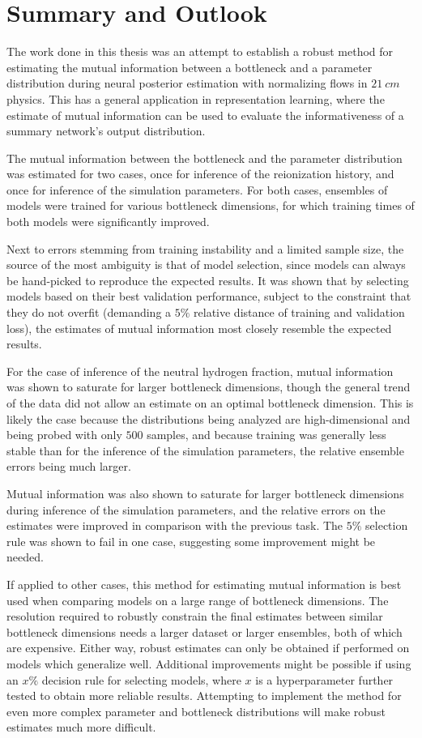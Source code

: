 \section{Summary and Outlook}
The work done in this thesis was an attempt to establish a robust method for estimating the mutual information between a bottleneck and a parameter distribution during neural posterior estimation with normalizing flows in $21~\si{cm}$ physics. This has a general application in representation learning, where the estimate of mutual information can be used to evaluate the informativeness of a summary network's output distribution. 

The mutual information between the bottleneck and the parameter distribution was estimated for two cases, once for inference of the reionization history, and once for inference of the simulation parameters. For both cases, ensembles of models were trained for various bottleneck dimensions, for which training times of both models were significantly improved.

Next to errors stemming from training instability and a limited sample size, the source of the most ambiguity is that of model selection, since models can always be hand-picked to reproduce the expected results. It was shown that by selecting models based on their best validation performance, subject to the constraint that they do not overfit (demanding a $5\%$ relative distance of training and validation loss), the estimates of mutual information most closely resemble the expected results.

For the case of inference of the neutral hydrogen fraction, mutual information was shown to saturate for larger bottleneck dimensions, though the general trend of the data did not allow an estimate on an optimal bottleneck dimension. This is likely the case because the distributions being analyzed are high-dimensional and being probed with only $500$ samples, and because training was generally less stable than for the inference of the simulation parameters, the relative ensemble errors being much larger.

Mutual information was also shown to saturate for larger bottleneck dimensions during inference of the simulation parameters, and the relative errors on the estimates were improved in comparison with the previous task. The $5\%$ selection rule was shown to fail in one case, suggesting some improvement might be needed.

If applied to other cases, this method for estimating mutual information is best used when comparing models on a large range of bottleneck dimensions. The resolution required to robustly constrain the final estimates between similar bottleneck dimensions needs a larger dataset or larger ensembles, both of which are expensive. Either way, robust estimates can only be obtained if performed on models which generalize well. Additional improvements might be possible if using an $x\%$ decision rule for selecting models, where $x$ is a hyperparameter further tested to obtain more reliable results. Attempting to implement the method for even more complex parameter and bottleneck distributions will make robust estimates much more difficult. 

